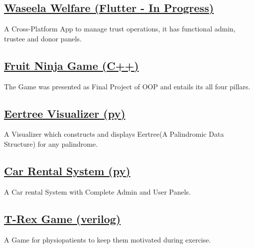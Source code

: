 \documentclass[]{m abbas resume' 2022}
\begin{document}
\begin{minipage}[t]{0.39\textwidth}
    \subsection{\href{https://github.com/smabbasht/Waseela-Welfare}{\textbf{Waseela Welfare (Flutter -  In Progress)}}}
    A Cross-Platform App to manage trust operations, it has functional admin, trustee and donor panels.
 
    \subsection{\href{https://github.com/smabbasht/CS224-OOP-FruitNinjaGame-cpp}{\textbf{Fruit Ninja Game (C++)}}}
    The Game was presented as Final Project of OOP and entails its all four pillars.

    \subsection{\href{https://github.com/smabbasht/CS201-DataSructures-II-Project-eertree}{\textbf{Eertree Visualizer (py)}}}
    A Visualizer which constructs and displays Eertree(A Palindromic Data Structure) for any palindrome.

    \subsection{\href{https://github.com/smabbasht/HU-DSA-Project}{\textbf{Car Rental System (py)}}}
    A Car rental System with Complete Admin and User Panels.

    \subsection{\href{https://github.com/smabbasht/CS370-DIgital-Logic-Design-Project}{\textbf{T-Rex Game (verilog)}}}
    A Game for physiopatients to keep them motivated during exercise.
    

 



\end{minipage}
\end{document}
